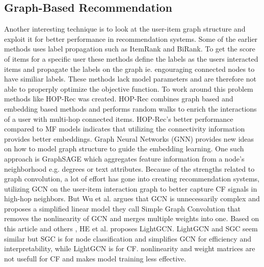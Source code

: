 \subsection{Graph-Based Recommendation}
Another interesting technique is to look at the user-item graph structure and exploit it for better performance in recommendation systems.
Some of the earlier methods uses label propagation such as ItemRank\cite{ItemRank} and BiRank\cite{BiRank}.
To get the score of items for a specific user these methods define the labels as the users interacted items and propagate the labels on the graph ie. engouraging connected nodes to have similiar labels.
These methods lack model parameters and are therefore not able to properply optimize the objective function\cite{NGCF_2019}.
To work around this problem methods like HOP-Rec \cite{HOP_Rec} was created.
HOP-Rec combines graph based and embedding based methods and performs random walks to enrich the interactions of a user with multi-hop connected items.
HOP-Rec's better performance compared to MF models indicates that utilizing the connectivity information provides better embeddings.
Graph Neural Networks (GNN) provides new ideas on how to model graph structure to guide the embedding learning.
One such approach is GraphSAGE\cite{IND_REP_LEA} which aggregates feature information from a node's neighborhood e.g. degrees or text attributes.
Because of the strengths related to graph convolution, a lot of effort has gone into creating recommendation systems\cite{NGCF_2019,GC_MC,Priceaware}, utilizing GCN on the user-item interaction graph to better capture CF signals in high-hop neighbors.
But Wu et al. \cite{SGCN} argues that GCN is unnecessarily complex and proposes a simplified linear model they call Simple Graph Convolution that removes the nonlinearity of GCN and merges multiple weights into one.
Based on this article and others \cite{PRE_PROP,DEEP_GCN}, HE et al. \cite{lightgcn} proposes LightGCN.
LightGCN and SGC seem similar but SGC is for node classification and simplifies GCN for efficiency and interpretability, while LightGCN is for CF.
nonlinearity and weight matrices are not usefull for CF and makes model training less effective.
